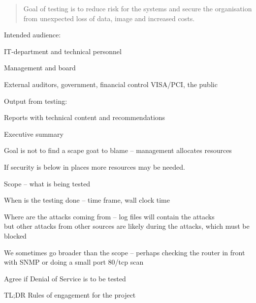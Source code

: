 \documentclass[Screen16to9,17pt]{foils}
\begin{document}

\begin{quote}
Goal of testing is to reduce risk for the systems and secure the organisation\\ from unexpected loss of data, image and increased costs.
\end{quote}

\begin{list1}
\item Intended audience:
\begin{list2}
\item IT-department and technical personnel
\item Management and board
\item External auditors, government, financial control VISA/PCI, the public
\end{list2}
\item Output from testing:
\begin{list2}
\item Reports with technical content and recommendations
\item Executive summary
\end{list2}
\end{list1}

Goal is not to find a scape goat to blame -- management allocates resources

If security is below in places more resources may be needed.




\begin{list2}
\item Scope -- what is being tested
\item When is the testing done -- time frame, wall clock time
\item Where are the attacks coming from -- log files will contain the attacks\\
but other attacks from other sources are likely during the attacks, which must be blocked
\item We sometimes go broader than the scope -- perhaps checking the router in front with SNMP or doing a small port 80/tcp scan
\item Agree if Denial of Service is to be tested
\item TL;DR Rules of engagement for the project
\end{list2}


\end{document}

